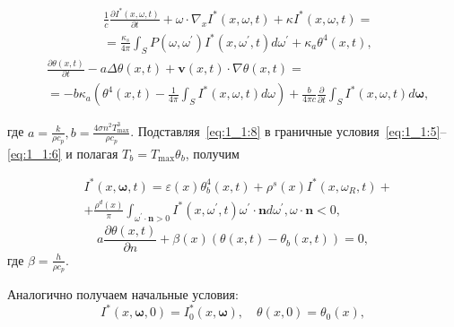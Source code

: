 \begin{equation}
    \label{eq:1_1:9}
    \begin{aligned}
        &\frac{1}{c} \frac{\partial I^{*}(x, \omega, t)}{\partial t}
        +\omega \cdot \nabla_{x} I^{*}(x, \omega, t) +\kappa I^{*}(x, \omega, t)=\\
        &= \frac{\kappa_{s}}{4 \pi} \int_{S} P\left(\omega, \omega^{\prime}\right) I^{*}
        \left(x, \omega^{\prime}, t\right) d \omega^{\prime}+\kappa_{a} \theta^{4}(x, t),
    \end{aligned}
\end{equation}
\begin{equation}
    \label{eq:1_1:10}
    \begin{aligned}
        &\frac{\partial \theta(x, t)}{\partial t}
        -a \Delta \theta(x, t)+\mathbf{v}(x, t) \cdot \nabla \theta(x, t)=\\
        &=-b \kappa_{a}\left(\theta^{4}(x, t)-\frac{1}{4 \pi}
        \int_{S} I^{*}(x, \omega, t) d \omega\right)
        +\frac{b}{4 \pi c} \frac{\partial}{\partial t}
        \int_{S} I^{*}(x, \omega, t) d \boldsymbol{\omega},
    \end{aligned}
\end{equation}

где $a=\frac{k}{\rho c_{p}}, b=\frac{4 \sigma n^{2} T_{\max }^{3}}{\rho c_{p}}$.
Подставляя~\eqref{eq:1_1:8} в граничные условия~\eqref{eq:1_1:5}--\eqref{eq:1_1:6}
и полагая $T_{b}=T_{\max } \theta_{b}$, получим

\begin{equation}
    \label{eq:1_1:11}
    \begin{aligned}
        & I^{*}(x, \boldsymbol{\omega}, t) =
        \varepsilon(x) \theta_{b}^{4}(x, t)
        +\rho^{s}(x) I^{*}\left(x, \omega_{R}, t\right)+ \\
        & +\frac{\rho^{d}(x)}{\pi} \int_{\omega^{\prime} \cdot \mathbf{n}>0} I^{*}
        \left(x, \omega^{\prime}, t\right) \omega^{\prime}
        \cdot \mathbf{n} d \omega^{\prime}, \omega \cdot \mathbf{n}<0,
    \end{aligned}
\end{equation}
\begin{equation}
    \label{eq:1_1:12}
    a \frac{\partial \theta(x, t)}{\partial n}+\beta(x)\left(\theta(x, t)
    -\theta_{b}(x, t)\right)=0,
\end{equation}
где $\beta=\frac{h}{\rho c_{p}}$.


Аналогично получаем начальные условия:
\begin{equation}
    \label{eq:1_1:13}
    I^{*}(x, \boldsymbol{\omega}, 0)=I_{0}^{*}(x, \boldsymbol{\omega}),
    \quad \theta(x, 0)=\theta_{0}(x),
\end{equation}

